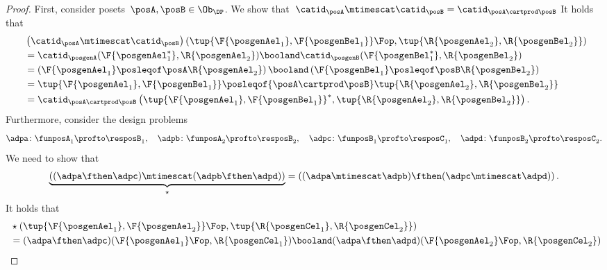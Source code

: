 \begin{proof}
	First, consider posets~$\posA,\posB\in \Ob_\DP$.
	We show that~$\catid_\posA\mtimescat \catid_\posB = \catid_{\posA\cartprod \posB}$
	It holds that
	\begin{equation}
		\begin{aligned}
			~ & \left( \catid_{\posA}\mtimescat \catid_{\posB}\right)
			\left( \tup{\F{\posgenAel_1},\F{\posgenBel_1}}\Fop,\tup{\R{\posgenAel_2},\R{\posgenBel_2}}\right)                                        \\
			  & =
			\catid_\posgenA(\F{\posgenAel_1^*},\R{\posgenAel_2})\booland \catid_\posgenB(\F{\posgenBel_1^*},\R{\posgenBel_2})                        \\
			  & =\left( \F{\posgenAel_1}\posleqof\posA \R{\posgenAel_2}\right)\booland \left( \F{\posgenBel_1}\posleqof\posB \R{\posgenBel_2}\right) \\
			  & =\tup{\F{\posgenAel_1},\F{\posgenBel_1}}\posleqof{\posA\cartprod \posB}\tup{\R{\posgenAel_2},\R{\posgenBel_2}}                       \\
			  & =\catid_{\posA\cartprod \posB}\left( \tup{\F{\posgenAel_1},\F{\posgenBel_1}}^*,\tup{\R{\posgenAel_2},\R{\posgenBel_2}}\right).
		\end{aligned}
	\end{equation}
	Furthermore, consider the design problems
	\begin{equation*}
		\adpa\colon \funposA_1 \profto \resposB_1,\quad \adpb\colon \funposA_2\profto \resposB_2, \quad \adpc\colon \funposB_1\profto \resposC_1,\quad \adpd\colon \funposB_2\profto \resposC_2.
	\end{equation*}
	We need to show that
	\begin{equation}
		\underbrace{\left( (\adpa\fthen \adpc) \mtimescat (\adpb\fthen \adpd)\right)}_{\star}=\left( (\adpa\mtimescat \adpb)\fthen (\adpc\mtimescat \adpd)\right).
	\end{equation}
	It holds that
	\begin{equation}
		\begin{aligned}
			~ & \star \left( \tup{\F{\posgenAel_1},\F{\posgenAel_2}}\Fop,\tup{\R{\posgenCel_1},\R{\posgenCel_2}}\right)                                                                                                                                                                                                                                                                      \\
			  & = (\adpa\fthen \adpc)(\F{\posgenAel_1}\Fop,\R{\posgenCel_1})\booland (\adpa\fthen \adpd)(\F{\posgenAel_2}\Fop,\R{\posgenCel_2})                                                                                                                                                                                                                                              \\

\end{aligned}
\end{equation}
\end{proof}
